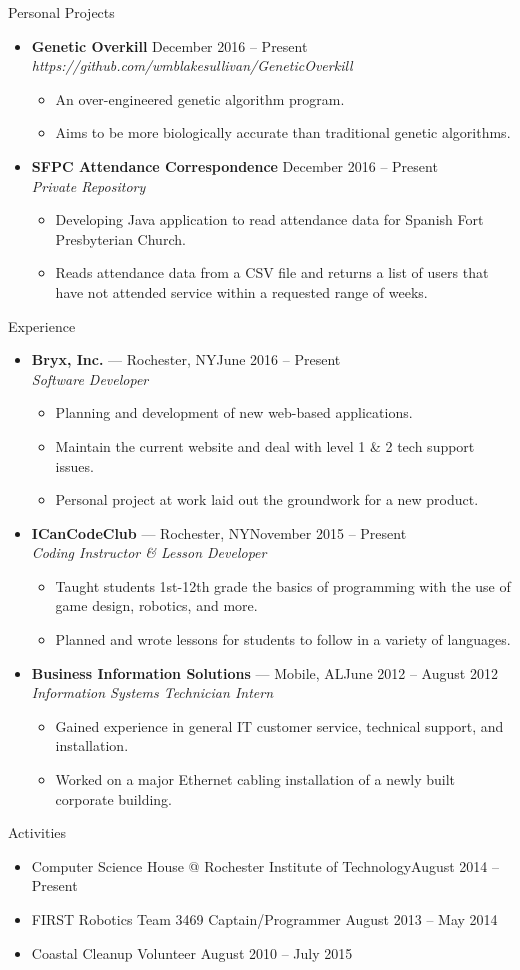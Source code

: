\documentclass[10pt,oneside]{article}
\newenvironment{ressection}[1]{
	\vspace{3pt}
	{\fontfamily{bch}\selectfont\Large#1}
	\begin{itemize}
	\vspace{2pt}
}{
	\end{itemize}
}
\newcommand{\resitem}[1]{
	\vspace{-2pt}
	\item \begin{flushleft} #1 \end{flushleft}
}
\newcommand{\ressubitem}[1]{
	\vspace{-1pt}
	\item \begin{flushleft} #1 \end{flushleft}
}
\newcommand{\resbigitem}[3]{
	\vspace{-3pt}
	\item
	\textbf{#1} --- #2 \\
	\textit{#3}
}
\newcommand{\resaltitem}[3]{
	\vspace{-3pt}
	\item
	\textbf{#1} \hfill #2 \\
	\textit{#3}
}
\newenvironment{ressubsec}[3]{
	\resbigitem{#1}{#2}{#3}
	\vspace{-1pt}
	\begin{itemize}
}{
	\end{itemize}
}
\newenvironment{resaltsec}[3]{
	\resaltitem{#1}{#2}{#3}
	\vspace{-1pt}
	\begin{itemize}
}{
	\end{itemize}
}
\begin{document}
\begin{ressection}{Personal Projects}

	\begin{resaltsec}{Genetic Overkill}{December 2016 -- Present}{https://github.com/wmblakesullivan/GeneticOverkill}
		\ressubitem{An over-engineered genetic algorithm program.}
		\ressubitem{Aims to be more biologically accurate than traditional genetic algorithms.}
	\end{resaltsec}
	\begin{resaltsec}{SFPC Attendance Correspondence}{December 2016 -- Present}{Private Repository}
		\ressubitem{Developing Java application to read attendance data for Spanish Fort Presbyterian Church.}
		\ressubitem{Reads attendance data from a CSV file and returns a list of users that have not attended service within a requested range of weeks.}
	\end{resaltsec}
\end{ressection}


\begin{ressection}{Experience}

	\begin{ressubsec}{Bryx, Inc.}{Rochester, NY\hfill June 2016 -- Present}{Software Developer}
		\ressubitem{Planning and development of new web-based applications.}
		\ressubitem{Maintain the current website and deal with level 1 \& 2 tech support issues.}
		\ressubitem{Personal project at work laid out the groundwork for a new product.}
	\end{ressubsec}
	\begin{ressubsec}{ICanCodeClub}{Rochester, NY\hfill November 2015 -- Present}{Coding Instructor \& Lesson Developer}
		\ressubitem{Taught students 1st-12th grade the basics of programming with the use of game design, robotics, and more.}
		\ressubitem{Planned and wrote lessons for students to follow in a variety of languages.}
	\end{ressubsec}
	\begin{ressubsec}{Business Information Solutions}{Mobile, AL\hfill June 2012 -- August 2012}{Information Systems Technician Intern}
		\ressubitem{Gained experience in general IT customer service, technical support, and installation.}
		\ressubitem{Worked on a major Ethernet cabling installation of a newly built corporate building.}
	\end{ressubsec}

\end{ressection}


\begin{ressection}{Activities}

	\resitem{Computer Science House @ Rochester Institute of Technology\hfill August 2014 -- Present}
	\resitem{FIRST Robotics Team 3469 Captain/Programmer \hfill August 2013 -- May 2014}
	\resitem{Coastal Cleanup Volunteer \hfill August 2010 -- July 2015}

\end{ressection}
\end{document}
